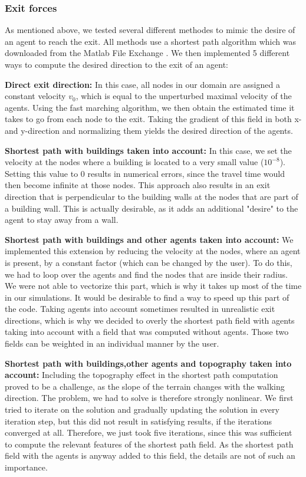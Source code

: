 \documentclass[11pt]{article}
\begin{document}
\subsubsection{Exit forces}
As mentioned above, we tested several different methodes to mimic the desire of an agent to reach the exit. All methods use a shortest path algorithm which was downloaded from the Matlab File Exchange \citep{fastmarching}. We then implemented 5 different ways to compute the desired direction to the exit of an agent:
\begin{description}
\item{\textbf{Direct exit direction: }}In this case, all nodes in our domain are assigned a constant velocity $v_0$, which is equal to the unperturbed maximal velocity of the agents. Using the fast marching algorithm, we then obtain the estimated time it takes to go from each node to the exit. Taking the gradient of this field in both x- and y-direction and normalizing them yields the desired direction of the agents.
\item{\textbf{Shortest path with buildings taken into account: }} In this case, we set the velocity at the nodes where a building is located to a very small value ($10^{-8}$). Setting this value to 0 results in numerical errors, since the travel time would then become infinite at those nodes. This approach also results in an exit direction that is perpendicular to the building walls at the nodes that are part of a building wall. This is actually desirable, as it adds an additional "desire" to the agent to stay away from a wall.
\item{\textbf{Shortest path with buildings and other agents taken into account: }} We implemented this extension by reducing the velocity at the nodes, where an agent is present, by a constant factor (which can be changed by the user). To do this, we had to loop over the agents and find the nodes that are inside their radius. We were not able to vectorize this part, which is why it takes up most of the time in our simulations. It would be desirable to find a way to speed up this part of the code. Taking agents into account sometimes resulted in unrealistic exit directions, which is why we decided to overly the shortest path field with agents taking into account with a field that was computed without agents. Those two fields can be weighted in an individual manner by the user.
\item{\textbf{Shortest path with buildings,other agents and topography taken into account: }}Including the topography effect in the shortest path computation proved to be a challenge, as the slope of the terrain changes with the walking direction. The problem, we had to solve is therefore strongly nonlinear. We first tried to iterate on the solution and gradually updating the solution in every iteration step, but this did not result in satisfying results, if the iterations converged at all. Therefore, we just took five iterations, since this was sufficient to compute the relevant features of the shortest path field. As the shortest path field with the agents is anyway added to this field, the details are not of such an importance.

\end{description}
\end{document}
